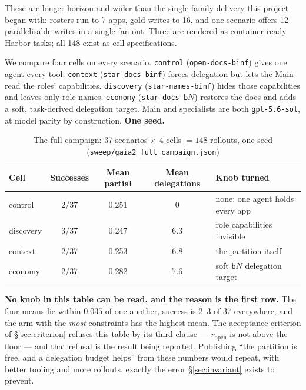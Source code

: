 \documentclass[11pt,a4paper]{article}
\begin{document}
These are longer-horizon and wider than the single-family delivery this project began with: rosters run to 7 apps, gold writes to 16, and one scenario offers 12 parallelisable writes in a single fan-out. Three are rendered as container-ready Harbor tasks; all 148 exist as cell specifications.

We compare four cells on every scenario. \texttt{control} (\texttt{open-docs-binf}) gives one agent every tool. \texttt{context} (\texttt{star-docs-binf}) forces delegation but lets the Main read the roles' capabilities. \texttt{discovery} (\texttt{star-names-binf}) hides those capabilities and leaves only role names. \texttt{economy} (\texttt{star-docs-b}$N$) restores the docs and adds a soft, task-derived delegation target. Main and specialists are both \texttt{gpt-5.6-sol}, at model parity by construction. \textbf{One seed.}

\begin{table}[H]
\centering
\small
\caption{The full campaign: 37 scenarios $\times$ 4 cells $=148$ rollouts, one seed (\texttt{sweep/gaia2\_full\_campaign.json})}
\label{tab:results}
\begin{tabularx}{\textwidth}{>{\raggedright\arraybackslash}p{2.5cm} c c c X}
\toprule
Cell & Successes & Mean partial & Mean delegations & Knob turned\\
\midrule
control & 2/37 & 0.251 & 0 & none: one agent holds every app\\
discovery & 3/37 & 0.247 & 6.3 & role capabilities invisible\\
context & 2/37 & 0.253 & 6.8 & the partition itself\\
economy & 2/37 & 0.282 & 7.6 & soft \texttt{b}$N$ delegation target\\
\bottomrule
\end{tabularx}
\end{table}

\textbf{No knob in this table can be read, and the reason is the first row.} The four means lie within $0.035$ of one another, success is 2--3 of 37 everywhere, and the arm with the \emph{most} constraints has the highest mean. The acceptance criterion of \S\ref{sec:criterion} refuses this table by its third clause --- $r_{\mathrm{open}}$ is not above the floor --- and that refusal is the result being reported. Publishing ``the partition is free, and a delegation budget helps'' from these numbers would repeat, with better tooling and more rollouts, exactly the error \S\ref{sec:invariant} exists to prevent.
\end{document}
